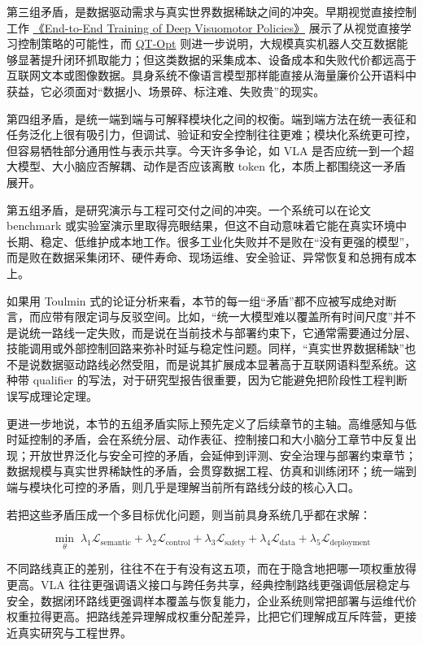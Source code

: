 第三组矛盾，是数据驱动需求与真实世界数据稀缺之间的冲突。早期视觉直接控制工作 \href{https://arxiv.org/abs/1504.00702}{《End-to-End Training of Deep Visuomotor Policies》} 展示了从视觉直接学习控制策略的可能性，而 \href{https://arxiv.org/abs/1806.10293}{QT-Opt} 则进一步说明，大规模真实机器人交互数据能够显著提升闭环抓取能力；但这类数据的采集成本、设备成本和失败代价都远高于互联网文本或图像数据。具身系统不像语言模型那样能直接从海量廉价公开语料中获益，它必须面对“数据小、场景碎、标注难、失败贵”的现实。

第四组矛盾，是统一端到端与可解释模块化之间的权衡。端到端方法在统一表征和任务泛化上很有吸引力，但调试、验证和安全控制往往更难；模块化系统更可控，但容易牺牲部分通用性与表示共享。今天许多争论，如 VLA 是否应统一到一个超大模型、大小脑应否解耦、动作是否应该离散 token 化，本质上都围绕这一矛盾展开。

第五组矛盾，是研究演示与工程可交付之间的冲突。一个系统可以在论文 benchmark 或实验室演示里取得亮眼结果，但这不自动意味着它能在真实环境中长期、稳定、低维护成本地工作。很多工业化失败并不是败在“没有更强的模型”，而是败在数据采集闭环、硬件寿命、现场运维、安全验证、异常恢复和总拥有成本上。

如果用 Toulmin 式的论证分析来看，本节的每一组“矛盾”都不应被写成绝对断言，而应带有限定词与反驳空间。比如，“统一大模型难以覆盖所有时间尺度”并不是说统一路线一定失败，而是说在当前技术与部署约束下，它通常需要通过分层、技能调用或外部控制回路来弥补时延与稳定性问题。同样，“真实世界数据稀缺”也不是说数据驱动路线必然受阻，而是说其扩展成本显著高于互联网语料型系统。这种带 qualifier 的写法，对于研究型报告很重要，因为它能避免把阶段性工程判断误写成理论定理。

更进一步地说，本节的五组矛盾实际上预先定义了后续章节的主轴。高维感知与低时延控制的矛盾，会在系统分层、动作表征、控制接口和大小脑分工章节中反复出现；开放世界泛化与安全可控的矛盾，会延伸到评测、安全治理与部署约束章节；数据规模与真实世界稀缺性的矛盾，会贯穿数据工程、仿真和训练闭环；统一端到端与模块化可控的矛盾，则几乎是理解当前所有路线分歧的核心入口。

若把这些矛盾压成一个多目标优化问题，则当前具身系统几乎都在求解：

\begingroup
\scriptsize
\begin{equation*}
\min_{\theta}\;
\lambda_1 \mathcal{L}_{\text{semantic}}
+ \lambda_2 \mathcal{L}_{\text{control}}
+ \lambda_3 \mathcal{L}_{\text{safety}}
+ \lambda_4 \mathcal{L}_{\text{data}}
+ \lambda_5 \mathcal{L}_{\text{deployment}}
\end{equation*}
\endgroup

不同路线真正的差别，往往不在于有没有这五项，而在于隐含地把哪一项权重放得更高。VLA 往往更强调语义接口与跨任务共享，经典控制路线更强调低层稳定与安全，数据闭环路线更强调样本覆盖与恢复能力，企业系统则常把部署与运维代价权重拉得更高。把路线差异理解成权重分配差异，比把它们理解成互斥阵营，更接近真实研究与工程世界。

